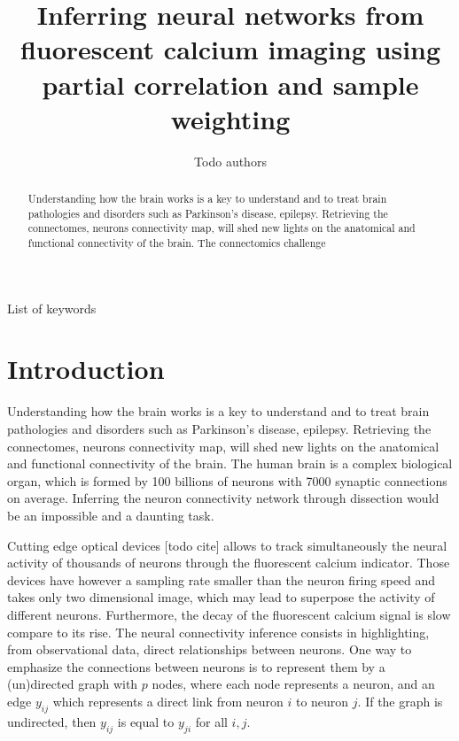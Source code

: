\documentclass[wcp]{jmlr}
\title[Connectomics challenge]{Inferring neural networks from fluorescent
                               calcium imaging using partial correlation and
                               sample weighting}
\author{Todo authors}
\begin{document}
\maketitle


\begin{abstract}
Understanding how the brain works is a key to understand and to treat
brain pathologies and disorders such as Parkinson's disease, epilepsy.
Retrieving the connectomes, neurons connectivity map, will shed new lights on
the anatomical and functional connectivity of the brain.
The connectomics challenge

\end{abstract}

\begin{keywords}
List of keywords
\end{keywords}


\section{Introduction}\label{sec:intro}

Understanding how the brain works is a key to understand and to treat
brain pathologies and disorders such as Parkinson's disease, epilepsy.
Retrieving the connectomes, neurons connectivity map, will shed new lights on
the anatomical and functional connectivity of the brain.
The human brain is a complex biological organ, which is formed by 100
billions of neurons with 7000 synaptic connections on average. Inferring the
neuron connectivity network through dissection would be an impossible
and a daunting task.

Cutting edge optical devices [todo cite] allows to track simultaneously
the neural activity of thousands of neurons through the fluorescent
calcium indicator. Those devices have however a sampling rate smaller
than the neuron firing speed and takes only two dimensional image, which may lead
to superpose the activity of different neurons. Furthermore, the
decay of the fluorescent calcium signal is slow compare to its rise.
The neural connectivity inference consists in highlighting, from observational
data, direct relationships between neurons. One way to emphasize the
connections between neurons is to represent them by a (un)directed graph with
$p$ nodes, where each node represents a neuron, and an edge $y_{ij}$ which
represents a direct link from neuron  $i$ to neuron $j$. If the graph is
undirected, then $y_{ij}$ is equal to $y_{ji}$  for all $i,j$.
\end{document}
